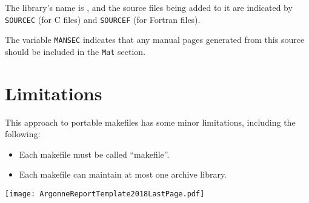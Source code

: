The library's name is , and the source files being added
to it are indicated by \lstinline{SOURCEC} (for C files) and \lstinline{SOURCEF} (for
Fortran files).

The variable \lstinline{MANSEC} indicates that any manual pages generated
from this source should be included in the \lstinline{Mat} section.

\section{Limitations}

This approach to portable makefiles has some minor limitations, including
the following:
\begin{itemize}
\item Each makefile must be called ``makefile''.
\item Each makefile can maintain at most one archive library.
\end{itemize}






\pagestyle{empty}
\begin{figure*}[hbt]
\centerline{\texttt{[image: ArgonneReportTemplate2018LastPage.pdf]}}
\caption{}
\end{figure*}



